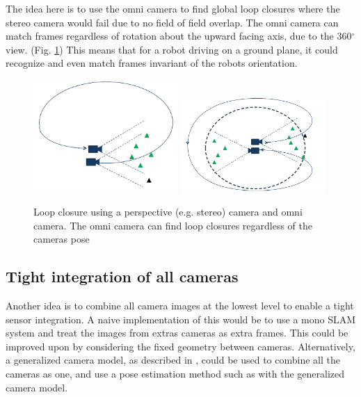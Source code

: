 The idea here is to use the omni camera to find global loop closures where the stereo camera would fail due to no field of field overlap.  The omni camera can match frames regardless of rotation about the upward facing axis, due to the 360$^{\circ}$ view.  (Fig. \ref{fig:omni_loop_close}) This means that for a robot driving on a ground plane, it could recognize and even match frames invariant of the robots orientation.

\begin{figure}[h!]
  \centering
    \includegraphics[width=0.49\textwidth]{chapters/images/stereo_loop}
    \includegraphics[width=0.49\textwidth]{chapters/images/omni_loop} 
    \caption{Loop closure using a perspective (e.g. stereo) camera and omni camera.  The omni camera can find loop closures regardless of the cameras pose}
  \label{fig:omni_loop_close}
\end{figure}

\subsection{Tight integration of all cameras}

Another idea is to combine all camera images at the lowest level to enable a tight sensor integration.  A naive implementation of this would be to use a mono SLAM system and treat the images from extras cameras as extra frames.  This could be improved upon by considering the fixed geometry between cameras.  Alternatively, a generalized camera model, as described in \cite{pless_03}, could be used to combine all the cameras as one, and use a pose estimation method such as \cite{stewenius_05} with the generalized camera model.

